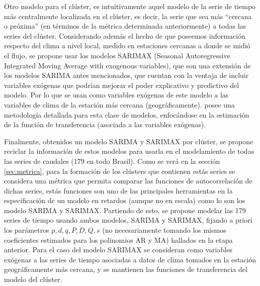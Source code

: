 \documentclass[12pt,oneside]{book}\usepackage[]{graphicx}\usepackage[]{color}
\theoremstyle{definition} %
\begin{document}
Otro modelo para el clúster, es intuitivamente aquel modelo de la serie de tiempo más centralmente localizada en el clúster, es decir, la serie que sea más ``cercana o próxima'' (en términos de la métrica determinada anteriormente) a todas las series del clúster. 
Considerando además el hecho de que poseemos información respecto del clima a nivel local, medido en estaciones cercanas a donde se midió el flujo, se propone usar los modelos SARIMAX (Seasonal Autoregressive Integrated Moving Average with exogenous variables), que son una extensión de los modelos SARIMA antes mencionados, que cuentan con la ventaja de incluir variables exógenas que podrían mejorar el poder explicativo y predictivo del modelo. 
Por lo que se usan como variables exógenas de este modelo a las variables de clima de la estación más cercana (geográficamente). \citeauthor{novales1993econometria} \citeyear{novales1993econometria} posee una metodología detallada para esta clase de modelos, enfocándose en la estimación de la función de transferencia (asociada a las variables exógenas). 





Finalmente, obtenidos un modelo SARIMA y SARIMAX por clúster, se propone reciclar la información de estos modelos para usarla en el modelamiento de todas las series de caudales (179 en todo Brasil). %
Como se verá en la sección \ref{sec:metrica}, para la formación de los clústers que contienen estás series se considera una métrica que permita comparar las funciones de autocorrelación de dichas series, estás funciones son uno de las principales herramientas en la especificación de un modelo en retardos (aunque no en escala) como lo son los modelo SARIMA y SARIMAX. 
Partiendo de esto, se propone modelar las 179 series de tiempo usando ambos modelos, SARIMA y SARIMAX, fijando a priori los parámetros $p,d,q,P,D,Q,s$ (no necesariamente tomando los mismos coeficientes estimados para los polinomios AR y MA) hallados en la etapa anterior. Para el caso del modelo SARIMAX se consideran  como variables exógenas a las series de tiempo asociadas a datos de clima tomados en la estación geográficamente más cercana, y se mantienen las funciones de transferencia del modelo del clúster.  
\end{document}
